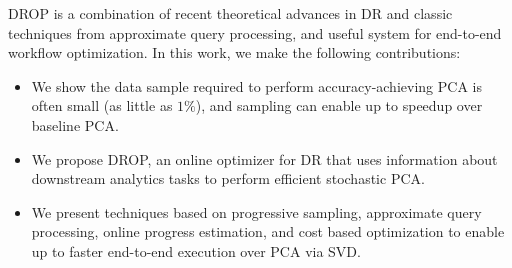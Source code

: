 DROP is a combination of recent theoretical advances in DR and classic techniques from approximate query processing, and useful system for end-to-end workflow optimization.
In this work, we make the following contributions:
\begin{itemize}

\item We show the data sample required to perform accuracy-achieving PCA is often small (as little as $1\%$), and sampling can enable up to \red{$91\times$} speedup over baseline PCA. 
  
\item We propose DROP, an online optimizer for DR that uses information about downstream analytics tasks to perform efficient stochastic PCA.

\item We present techniques based on progressive sampling, approximate query processing, online progress estimation, and cost based optimization to enable up to \red{$5\times$} faster end-to-end execution over PCA via SVD.%
\end{itemize}




